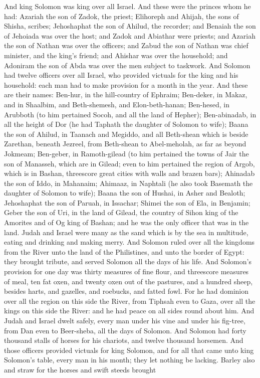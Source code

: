 And king Solomon was king over all Israel. And these were the princes whom he had: Azariah the son of Zadok, the priest; Elihoreph and Ahijah, the sons of Shisha, scribes; Jehoshaphat the son of Ahilud, the recorder; and Benaiah the son of Jehoiada was over the host; and Zadok and Abiathar were priests; and Azariah the son of Nathan was over the officers; and Zabud the son of Nathan was chief minister, and the king’s friend; and Ahishar was over the household; and Adoniram the son of Abda was over the men subject to taskwork.  And Solomon had twelve officers over all Israel, who provided victuals for the king and his household: each man had to make provision for a month in the year. And these are their names: Ben-hur, in the hill-country of Ephraim; Ben-deker, in Makaz, and in Shaalbim, and Beth-shemesh, and Elon-beth-hanan; Ben-hesed, in Arubboth (to him pertained Socoh, and all the land of Hepher); Ben-abinadab, in all the height of Dor (he had Taphath the daughter of Solomon to wife); Baana the son of Ahilud, in Taanach and Megiddo, and all Beth-shean which is beside Zarethan, beneath Jezreel, from Beth-shean to Abel-meholah, as far as beyond Jokmeam; Ben-geber, in Ramoth-gilead (to him pertained the towns of Jair the son of Manasseh, which are in Gilead; even to him pertained the region of Argob, which is in Bashan, threescore great cities with walls and brazen bars); Ahinadab the son of Iddo, in Mahanaim; Ahimaaz, in Naphtali (he also took Basemath the daughter of Solomon to wife); Baana the son of Hushai, in Asher and Bealoth; Jehoshaphat the son of Paruah, in Issachar; Shimei the son of Ela, in Benjamin; Geber the son of Uri, in the land of Gilead, the country of Sihon king of the Amorites and of Og king of Bashan; and he was the only officer that was in the land.  Judah and Israel were many as the sand which is by the sea in multitude, eating and drinking and making merry. And Solomon ruled over all the kingdoms from the River unto the land of the Philistines, and unto the border of Egypt: they brought tribute, and served Solomon all the days of his life. And Solomon’s provision for one day was thirty measures of fine flour, and threescore measures of meal, ten fat oxen, and twenty oxen out of the pastures, and a hundred sheep, besides harts, and gazelles, and roebucks, and fatted fowl. For he had dominion over all the region on this side the River, from Tiphsah even to Gaza, over all the kings on this side the River: and he had peace on all sides round about him. And Judah and Israel dwelt safely, every man under his vine and under his fig-tree, from Dan even to Beer-sheba, all the days of Solomon. And Solomon had forty thousand stalls of horses for his chariots, and twelve thousand horsemen. And those officers provided victuals for king Solomon, and for all that came unto king Solomon’s table, every man in his month; they let nothing be lacking. Barley also and straw for the horses and swift steeds brought 